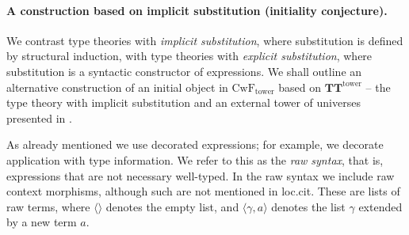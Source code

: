 \documentclass[submission,copyright,creativecommons]{eptcs}
\newcommand{\tuple}[1]{\langle #1 \rangle}
\def\CwFext{\mathrm{CwF_{tower}}}
\def\TText{{\mathbf{TT}^\mathrm{tower}}}
\begin{document}
\paragraph{A construction based on implicit substitution (initiality conjecture).} We contrast type theories with {\em implicit substitution}, where substitution is defined by structural induction, with type theories with {\em explicit substitution}, where substitution is a syntactic constructor of expressions.
We shall outline an alternative construction of an initial object in $\CwFext$ based on $\TText$ -- the type theory with implicit substitution and an external tower of universes presented in \cite[Section 3]{BezemCDE22}.

As already mentioned we use decorated expressions; for example, we decorate application with type information. We refer to this as the {\em raw syntax}, that is, expressions that are not necessary well-typed. In the raw syntax we include raw context morphisms, although such are not mentioned in loc.cit. These are lists of raw terms, where $\tuple{}$ denotes the empty list, and $\tuple{\gamma,a}$ denotes the list $\gamma$ extended by a new term $a$.
\end{document}
